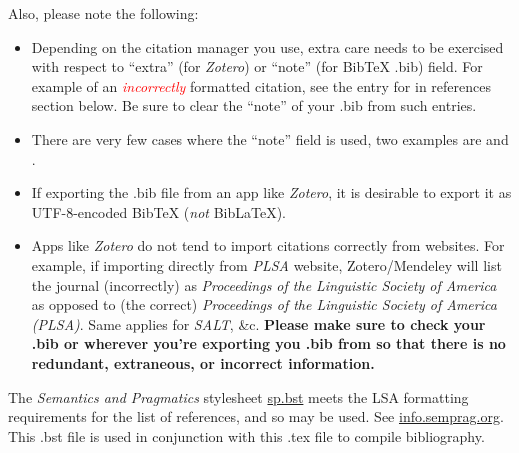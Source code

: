 \documentclass[12pt,letterpaper]{article}
\begin{document}
Also, please note the following:
\begin{itemize}
    \item Depending on the citation manager you use, extra care needs to be exercised with respect to ``extra'' (for \textit{Zotero}) or ``note'' (for BibTeX .bib) field. For example of an \textcolor{red}{\textit{incorrectly}} formatted citation, see the entry for \cite{sankoff_formal_1981} in references section below. Be sure to clear the ``note'' of your .bib from such entries.
    \item There are very few cases where the ``note'' field is used, two examples are \cite{ozernyi_linguistic_2022} and \cite{ozernyi_rise_2022}. 
    \item If exporting the .bib file from an app like \textit{Zotero}, it is desirable to export it as UTF-8-encoded BibTeX (\textit{not} BibLaTeX).
    \item Apps like \textit{Zotero} do not tend to import citations correctly from websites. For example, if importing directly from \textit{PLSA} website, Zotero/Mendeley will list the journal (incorrectly) as \textit{Proceedings of the Linguistic Society of America} as opposed to (the correct) \textit{Proceedings of the Linguistic Society of America (PLSA)}. Same applies for \textit{SALT}, \&c. \textbf{Please make sure to check your .bib or wherever you're exporting you .bib from so that there is no redundant, extraneous, or incorrect information.} 
\end{itemize}

The \textit{Semantics and Pragmatics} stylesheet \href{https://raw.githubusercontent.com/semprag/tex/master/sp.bst}{sp.bst} meets the LSA formatting requirements for the list of references, and so may be used. See \href{http://info.semprag.org}{info.semprag.org}. This .bst file is used in conjunction with this .tex file to compile bibliography.

\setlength{\bibsep}{0pt plus 0.3ex}
\setlength{\bibhang}{0.3in}	%
\titleformat{\section}{\normalfont\bfseries}{\thesection}{.5em}{} %

\newcommand{\doi}[1]{\href{https://doi.org/#1}{https://doi.org/#1}} %
\end{document}
